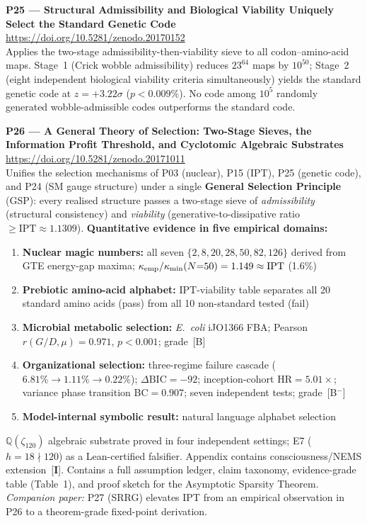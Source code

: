 \documentclass[11pt]{article}
\begin{document}
\medskip
\noindent\textbf{P25 — Structural Admissibility and Biological Viability
Uniquely Select the Standard Genetic Code}~\cite{SpivackGeneticCode}\\
\url{https://doi.org/10.5281/zenodo.20170152}\\
Applies the two-stage admissibility-then-viability sieve to all codon--amino-acid
maps.  Stage~1 (Crick wobble admissibility) reduces $23^{64}$ maps by $10^{50}$;
Stage~2 (eight independent biological viability criteria simultaneously) yields
the standard genetic code at $z = +3.22\sigma$ ($p < 0.009\%$).  No code among
$10^5$ randomly generated wobble-admissible codes outperforms the standard code.

\medskip
\noindent\textbf{P26 — A General Theory of Selection: Two-Stage Sieves, the
Information Profit Threshold, and Cyclotomic Algebraic Substrates}~\cite{SpivackGeneralSelection}\\
\url{https://doi.org/10.5281/zenodo.20171011}\\
Unifies the selection mechanisms of P03 (nuclear), P15 (IPT), P25 (genetic code),
and P24 (SM gauge structure) under a single \textbf{General Selection Principle}
(GSP): every realised structure passes a two-stage sieve of \emph{admissibility}
(structural consistency) and \emph{viability} (generative-to-dissipative ratio
$\ge \mathrm{IPT} \approx 1.1309$).
\textbf{Quantitative evidence in five empirical domains:}
\begin{enumerate}[noitemsep,topsep=2pt]
\item \textbf{Nuclear magic numbers:} all seven $\{2,8,20,28,50,82,126\}$ derived from
  GTE energy-gap maxima; $\kappa_{\rm emp}/\kappa_{\rm min}(N{=}50) = 1.149 \approx \mathrm{IPT}$
  (1.6\%)
\item \textbf{Prebiotic amino-acid alphabet:} IPT-viability table separates all 20 standard
  amino acids (pass) from all 10 non-standard tested (fail)
\item \textbf{Microbial metabolic selection:} \textit{E.~coli} iJO1366 FBA;
  Pearson $r(G/D,\mu) = 0.971$, $p < 0.001$; grade~[B]
\item \textbf{Organizational selection:} three-regime failure cascade
  ($6.81\%{\to}1.11\%{\to}0.22\%$); $\Delta\mathrm{BIC}=-92$;
  inception-cohort HR$=5.01\times$; variance phase transition BC$=0.907$;
  seven independent tests; grade~[B$^-$]
\item \textbf{Model-internal symbolic result:} natural language alphabet selection
\end{enumerate}
$\mathbb{Q}(\zeta_{120})$ algebraic substrate proved in four independent settings;
E7 ($h{=}18 \nmid 120$) as a Lean-certified falsifier.
Appendix contains consciousness/NEMS extension~[\textbf{I}].
Contains a full assumption ledger, claim taxonomy, evidence-grade table (Table~1),
and proof sketch for the Asymptotic Sparsity Theorem.
\emph{Companion paper:} P27 (SRRG) elevates IPT from an empirical observation in
P26 to a theorem-grade fixed-point derivation.
\end{document}
